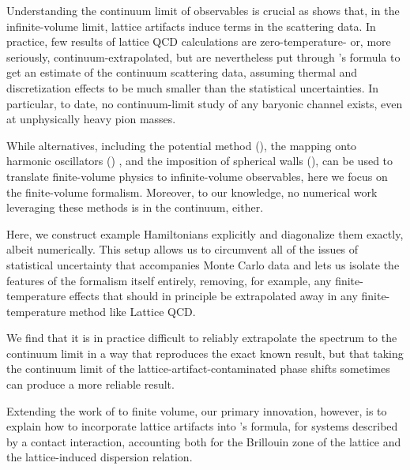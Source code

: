 Understanding the continuum limit of observables is crucial as  shows that, in the infinite-volume limit, lattice artifacts induce terms in the scattering data.
In practice, few results of lattice QCD calculations are zero-temperature- or, more seriously, continuum-extrapolated, but are nevertheless put through \Luscher's formula to get an estimate of the continuum scattering data, assuming thermal and discretization effects to be much smaller than the statistical uncertainties.
In particular, to date, no continuum-limit study of any baryonic channel exists, even at unphysically heavy pion masses.

While alternatives, including the potential method (), the mapping onto harmonic oscillators () , and the imposition of spherical walls (), can be used to translate finite-volume physics to infinite-volume observables, here we focus on the \Luscher finite-volume formalism.
Moreover, to our knowledge, no numerical work leveraging these methods is in the continuum, either.

Here, we construct example Hamiltonians explicitly and diagonalize them exactly, albeit numerically.
This setup allows us to circumvent all of the issues of statistical uncertainty that accompanies Monte Carlo data and lets us isolate the features of the formalism itself entirely, removing, for example, any finite-temperature effects that should in principle be extrapolated away in any finite-temperature method like Lattice QCD.

We find that it is in practice difficult to reliably extrapolate the spectrum to the continuum limit in a way that reproduces the exact known result, but that taking the continuum limit of the lattice-artifact-contaminated phase shifts sometimes can produce a more reliable result.

Extending the work of  to finite volume, our primary innovation, however, is to explain how to incorporate lattice artifacts into \Luscher's formula, for systems described by a contact interaction, accounting both for the Brillouin zone of the lattice and the lattice-induced dispersion relation.


